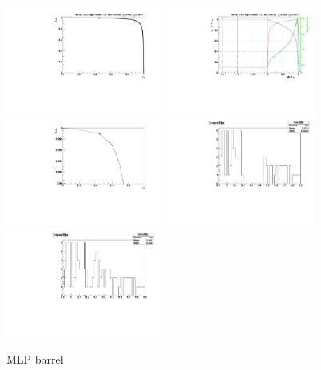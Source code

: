 \begin{figure}
  \centering
  \includegraphics[width=0.45\textwidth]{Figures/mlp/MLP_barrel_roc}
  \includegraphics[width=0.45\textwidth]{Figures/mlp/MLP_barrel_eff} 
  \includegraphics[width=0.45\textwidth]{Figures/mlp/MLP_barrel_roc_zoom}
  \includegraphics[width=0.45\textwidth]{Figures/mlp/MLP_barrel_mass}
  \includegraphics[width=0.45\textwidth]{Figures/mlp/MLP_barrel_mass_unblind}
\caption{MLP barrel}
\end{figure}


